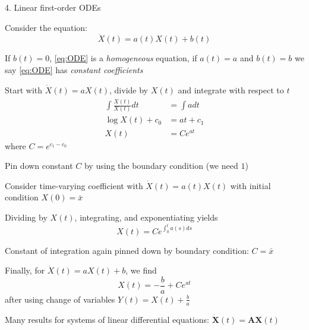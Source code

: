 \documentclass[11pt, aspectratio=169]{beamer}
\newenvironment{witemize}{\itemize\addtolength{\itemsep}{10pt}}{\enditemize}
\begin{document}
\begin{frame}{4. Linear first-order ODEs}
\begin{witemize}
\item Consider the equation:
\begin{equation}\label{eq:ODE}
	\dot X(t) = a(t) X(t) + b(t)
\end{equation}

\item If $b(t) = 0$, \eqref{eq:ODE} is a \textit{homogeneous} equation, if $a(t) = a$ and $b(t) = b$ we say \eqref{eq:ODE} has \textit{constant coefficients}

\item Start with $\dot X(t) = a X(t)$, divide by $X(t)$ and integrate with respect to $t$
\begin{align*}
	\int \frac{\dot X(t)}{X(t)} dt &= \int a dt \\
	\log X(t) + c_0 &= a t + c_1 \\
	X(t) &= C e^{a t}
\end{align*}
where $C = e^{c_1 - c_0}$

\item Pin down constant $C$ by using the boundary condition (we need $1$)
\end{witemize}
\end{frame}



\begin{frame}{}
\begin{witemize}
\item Consider time-varying coefficient with $\dot X(t) = a(t) X(t)$ with initial condition $X(0) = \bar x$

\item Dividing by $X(t)$, integrating, and exponentiating yields 
\begin{equation*}
	X(t) = C e^{ \int_0^t a(s) ds }
\end{equation*}

\item Constant of integration again pinned down by boundary condition: $C = \bar x$

\item Finally, for $\dot X(t) = a X(t) + b$, we find
\begin{equation*}
	X(t) = - \frac{b}{a} + C e^{at}
\end{equation*}
after using change of variables $Y(t) = X(t) + \frac{b}{a}$

\item Many results for systems of linear differential equations: $\dot{\bm X}(t) = \bm A \bm X(t)$

\end{witemize}
\end{frame}
\end{document}
